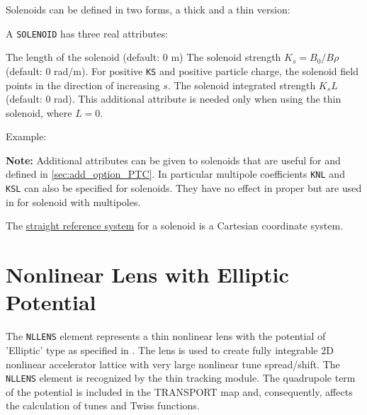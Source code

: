 Solenoids can be defined in two forms, a thick and a thin version: 


A {\tt SOLENOID} has three real attributes: 
\begin{madlist}
    The length of the solenoid (default: 0 m) 
    The solenoid strength $K_s = B_0 / B\rho$ (default: 0
     rad/m). For positive {\tt KS} and positive particle charge, the solenoid
     field points in the direction of increasing $s$.  
    The solenoid integrated strength $K_s L$
     (default: 0 rad).  This additional attribute is needed only when
     using the thin solenoid,  where $L=0$.     
\end{madlist}

Example: 

{\bf Note:} Additional attributes can be given to solenoids that
are useful for \ptc and defined in \ref{sec:add_option_PTC}.
In particular multipole coefficients {\tt KNL} and {\tt KSL} can also be 
specified for 
solenoids. They have no effect in \madx proper but are used in \ptc for 
solenoid with multipoles.

The \hyperref[subsec:local_straight]{straight reference system} for a
solenoid is a Cartesian coordinate system. 
 


\section{Nonlinear Lens with Elliptic Potential}
\label{sec:nllens}


The {\tt NLLENS} element represents a thin nonlinear lens with the potential
of 'Elliptic' type as specified in \cite{danilov2010}. The lens is used
to create fully integrable 2D nonlinear accelerator lattice with very
large nonlinear tune spread/shift. The {\tt NLLENS} element is recognized by
the thin tracking module. The quadrupole term of the potential is
included in the TRANSPORT map and, consequently, affects the calculation
of tunes and Twiss functions.   

